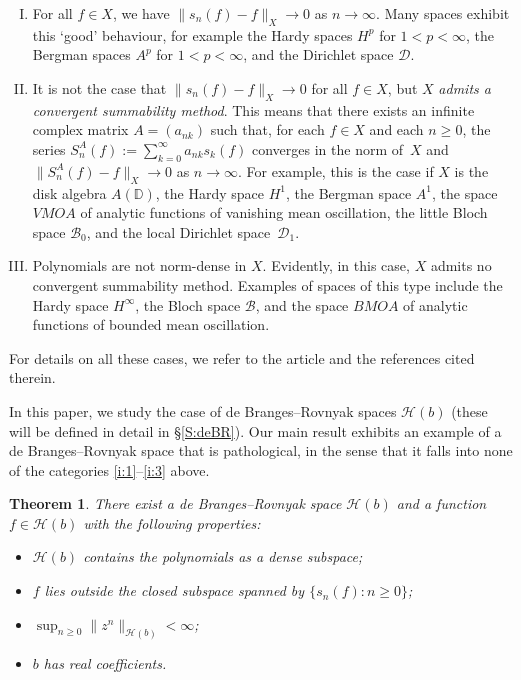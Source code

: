 \documentclass[11pt,reqno]{amsart}
\theoremstyle{plain}
\newtheorem{theorem}{Theorem}[section]
\theoremstyle{definition}
\theoremstyle{remark}
\newcommand{\cB}{\mathcal{B}}
\newcommand{\cD}{\mathcal{D}}
\newcommand{\cH}{\mathcal{H}}
\newcommand{\DD}{\mathbb{D}}
\begin{document}
\begin{enumerate}[(I)]
\item \label{i:1}
For all $f\in X$, we have $\|s_n(f)-f\|_X\to0$ as $n\to\infty$.
Many spaces exhibit this `good' behaviour, for example the Hardy spaces $H^p$ for $1<p<\infty$, 
the Bergman spaces $A^p$ for $1<p<\infty$, and the Dirichlet space $\cD$.
\item \label{i:2}
It is not the case that $\|s_n(f)-f\|_X\to0$ for all $f\in X$, but $X$ \emph{admits a convergent summability method}.
This means that there exists an infinite complex matrix $A=(a_{nk})$ such that, for each $f\in X$ and each $n\ge0$,
the series $S_n^A(f):=\sum_{k=0}^\infty a_{nk}s_k(f)$ converges in the norm of~$X$ and
$\|S_n^A(f)-f\|_X\to0$ as $n\to\infty$.
For example, this is the case if $X$ is the disk algebra $A(\DD)$, the Hardy space $H^1$,
the Bergman space $A^1$, the space $VMOA$ of analytic functions of vanishing mean oscillation,
the little Bloch space $\cB_0$, and the local Dirichlet space~$\cD_1$.

\item \label{i:3}
Polynomials are not norm-dense in $X$. Evidently, in this case, $X$  admits no convergent 
summability method. Examples of spaces of this type include the Hardy space $H^\infty$,
the Bloch space $\cB$, and the space $BMOA$ of analytic functions of bounded mean oscillation.
\end{enumerate} 

For details on all these cases, we refer to the article \cite{GMR24} and the references cited therein.

In this paper, we study the case of de Branges--Rovnyak spaces
$\cH(b)$ (these will be defined in detail in \S\ref{S:deBR}).
Our main result exhibits an example of 
a de Branges--Rovnyak space that
is pathological, in the sense that it
falls into none of the categories \ref{i:1}--\ref{i:3} above.

\begin{theorem}\label{T:main}
There exist a de Branges--Rovnyak space $\cH(b)$ and a function
$f\in\cH(b)$ with the following properties:
\begin{itemize}
\item $\cH(b)$ contains the polynomials as a dense subspace;
\item $f$ lies outside the closed subspace spanned by $\{s_n(f):n\ge0\}$;
\item $\sup_{n\ge0}\|z^n\|_{\cH(b)}<\infty$;
\item $b$ has real coefficients.
\end{itemize}
\end{theorem}
\end{document}
